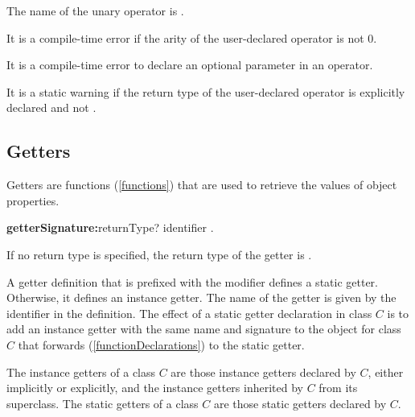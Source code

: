\documentclass{article}
\begin{document}

\LMHash{}
The name of the unary operator \code{-} is .


\LMHash{}
It is a compile-time error if the arity of the user-declared operator \code{\~{}} is not 0.

\LMHash{}
It is a compile-time error to declare an optional parameter in an operator.

\LMHash{}
It is a static warning if the return type of the user-declared operator \code{[]=} is explicitly declared and not \VOID{}.



\subsection{Getters}

\LMHash{}
Getters are functions (\ref{functions}) that are used to retrieve the values of object properties.

\begin{grammar}
{\bf getterSignature:}returnType? \GET{} identifier
  .
\end{grammar}

\LMHash{}
If no return type is specified, the return type of the getter is \DYNAMIC{}.

\LMHash{}
A getter definition that is prefixed with the \STATIC{} modifier defines a static getter.
Otherwise, it defines an instance getter.
The name of the getter is given by the identifier in the definition.
The effect of a static getter declaration in class $C$ is to add an instance getter with the same name and signature to the  object for class $C$ that forwards (\ref{functionDeclarations}) to the static getter.

\LMHash{}
The instance getters of a class $C$ are those instance getters declared by $C$, either implicitly or explicitly, and the instance getters inherited by $C$ from its superclass.
The static getters of a class $C$ are those static getters declared by $C$.
\end{document}
